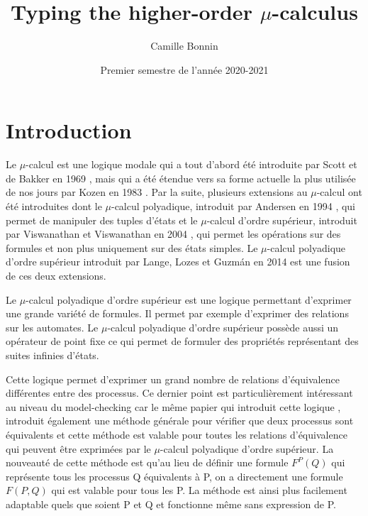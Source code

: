 \documentclass{rapport}
\title{Typing the higher-order $\mu$-calculus}
\author{Camille Bonnin}
\date{Premier semestre de l'année 2020-2021}
\theoremstyle{plain}
\theoremstyle{remark}
\theoremstyle{definition}
\begin{document}
\maketitle

\tableofcontents
\newpage

\section{Introduction\label{intro}}

Le $\mu$-calcul est une logique modale qui a tout d'abord été introduite par Scott et de Bakker en 1969 \citep{scott1969theory}, mais qui a été étendue vers sa forme actuelle la plus utilisée de nos jours par Kozen en 1983 \citep{kozen1983results}. Par la suite, plusieurs extensions au 
$\mu$-calcul ont été introduites dont le $\mu$-calcul polyadique, introduit par Andersen en 1994 \citep{andersen1994polyadic}, qui permet de manipuler des tuples d'états et le $\mu$-calcul d'ordre supérieur, introduit par Viswanathan et Viswanathan en 2004 \citep{viswanathan2004higher}, qui permet les opérations sur des formules et non plus uniquement sur des états simples. Le $\mu$-calcul polyadique d'ordre supérieur introduit par Lange, Lozes et Guzm{\'a}n en 2014 \citep{lange2014model} est une fusion de ces deux extensions.

Le $\mu$-calcul polyadique d'ordre supérieur est une logique permettant d'exprimer une grande variété de formules. Il permet par exemple d'exprimer des relations sur les automates. Le $\mu$-calcul polyadique d'ordre supérieur possède aussi un opérateur de point fixe ce qui permet de formuler des propriétés représentant des suites infinies d'états. 

Cette logique permet d'exprimer un grand nombre de relations d'équivalence différentes entre des processus. Ce dernier point est particulièrement intéressant au niveau du model-checking car le même papier qui introduit cette logique \citep{lange2014model}, introduit également une méthode générale pour vérifier que deux processus sont équivalents et cette méthode est valable pour toutes les relations d'équivalence qui peuvent être exprimées par le $\mu$-calcul polyadique d'ordre supérieur. La nouveauté de cette méthode est qu'au lieu de définir une formule $F^P(Q)$ qui représente tous les processus Q équivalents à P, on a directement une formule $F(P, Q)$ qui est valable pour tous les P. La méthode est ainsi plus facilement adaptable quels que soient P et Q et fonctionne même sans expression de P. 
\end{document}
